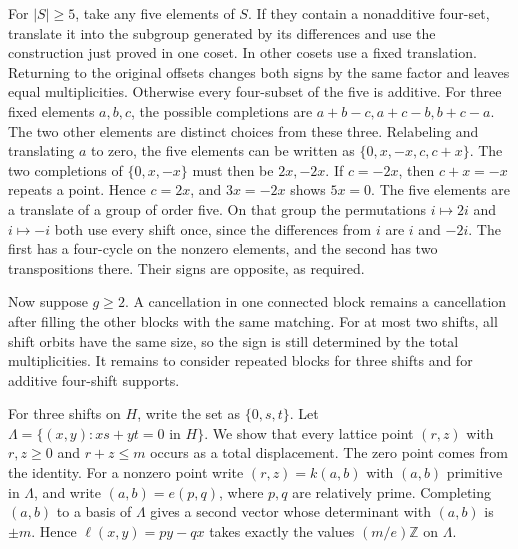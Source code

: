 \documentclass[11pt,reqno]{amsart}
\theoremstyle{remark}
\numberwithin{equation}{section}
\begin{document}
For \(|S|\ge5\), take any five elements of \(S\). If they contain a
nonadditive four-set, translate it into the subgroup generated by its
differences and use the construction just proved in one coset. In other
cosets use a fixed translation. Returning to the original offsets changes
both signs by the same factor and leaves equal multiplicities. Otherwise
every four-subset of the five is additive. For three fixed elements
\(a,b,c\), the possible completions are \(a+b-c,a+c-b,b+c-a\). The two
other elements are distinct choices from these three. Relabeling and
translating \(a\) to zero, the five elements can be written as
\(\{0,x,-x,c,c+x\}\). The two completions of \(\{0,x,-x\}\) must then be
\(2x,-2x\). If \(c=-2x\), then \(c+x=-x\) repeats a point. Hence
\(c=2x\), and \(3x=-2x\) shows \(5x=0\). The five elements are a
translate of a group of order five. On that group the permutations
\(i\mapsto2i\) and \(i\mapsto-i\) both use every shift once, since the
differences from \(i\) are \(i\) and \(-2i\). The first has a four-cycle
on the nonzero elements, and the second has two transpositions there.
Their signs are opposite, as required.

Now suppose \(g\ge2\). A cancellation in one connected block remains a
cancellation after filling the other blocks with the same matching. For
at most two shifts, all shift orbits have the same size, so the sign is
still determined by the total multiplicities. It remains to consider
repeated blocks for three shifts and for additive four-shift supports.

For three shifts on \(H\), write the set as \(\{0,s,t\}\). Let
\(\Lambda=\{(x,y):xs+yt=0\text{ in }H\}\). We show that every lattice
point \((r,z)\) with \(r,z\ge0\) and \(r+z\le m\) occurs as a total
displacement. The zero point comes from the identity. For a nonzero point
write \((r,z)=k(a,b)\) with \((a,b)\) primitive in \(\Lambda\), and write
\((a,b)=e(p,q)\), where \(p,q\) are relatively prime. Completing
\((a,b)\) to a basis of \(\Lambda\) gives a second vector whose
determinant with \((a,b)\) is \(\pm m\). Hence \(\ell(x,y)=py-qx\) takes
exactly the values \((m/e)\mathbb Z\) on \(\Lambda\).
\end{document}
